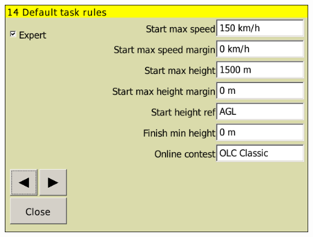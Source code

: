\begin{center}
\includegraphics[angle=0,width=0.8\linewidth,keepaspectratio='true']{figures/config-rules.png}
\end{center}

